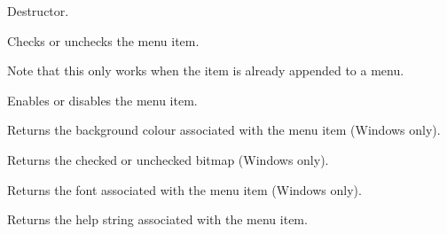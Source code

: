 



\label{wxmenuitemdtor}


Destructor.


\label{wxmenuitemcheck}


Checks or unchecks the menu item.

Note that this only works when the item is already appended to a menu.


\label{wxmenuitemenable}


Enables or disables the menu item.


\label{wxmenuitemgetbackgroundcolour}


Returns the background colour associated with the menu item (Windows only).


\label{wxmenuitemgetbitmap}


Returns the checked or unchecked bitmap (Windows only).


\label{wxmenuitemgetfont}


Returns the font associated with the menu item (Windows only).


\label{wxmenuitemgethelp}


Returns the help string associated with the menu item.


\label{wxmenuitemgetid}


